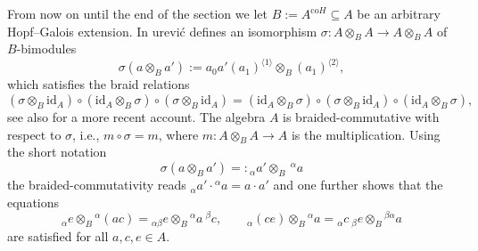 \documentclass{article}
\theoremstyle{definition}
\begin{document}
	From now on until the end of the section we let $B:=A^{\mathrm{co}H}\subseteq A$ be an arbitrary Hopf--Galois extension.
	In \cite{DurdBraid} \DJ ur\dj evi\'c defines an isomorphism $\sigma\colon A\otimes_BA\to A\otimes_BA$ of $B$-bimodules
	\begin{equation}
		\sigma(a\otimes_Ba'):=a_0a'(a_1)^{\langle 1\rangle}\otimes_B(a_1)^{\langle 2\rangle},
	\end{equation}
	which satisfies the braid relations
	$$
	(\sigma\otimes_B\mathrm{id}_A)\circ(\mathrm{id}_A\otimes_B\sigma)\circ(\sigma\otimes_B\mathrm{id}_A)=(\mathrm{id}_A\otimes_B\sigma)\circ(\sigma\otimes_B\mathrm{id}_A)\circ(\mathrm{id}_A\otimes_B\sigma),
	$$
	see also \cite[Section 5.1]{AntEmaTho} for a more recent account.
	The algebra $A$ is braided-commutative with respect to $\sigma$, i.e., $m\circ\sigma=m$, where $m\colon A\otimes_BA\to A$ is the multiplication. Using the short notation
	\begin{equation}
		\sigma(a\otimes_Ba')=:{}_\alpha a'\otimes_B~{}^\alpha a
	\end{equation}
	the braided-commutativity reads ${}_\alpha a'\cdot{}^\alpha a=a\cdot a'$ and one further shows that the equations
	\begin{equation}\label{eq:alphanotation}
		{}_\alpha e\otimes_B{}^\alpha(ac)
		={}_{\alpha\beta}e\otimes_B{}^\alpha a~{}^\beta c,\qquad
		{}_\alpha(ce)\otimes_B{}^\alpha a
		={}_\alpha c~{}_\beta e\otimes_B{}^{\beta\alpha}a
	\end{equation}
	are satisfied for all $a,c,e\in A$.
	
\end{document}
